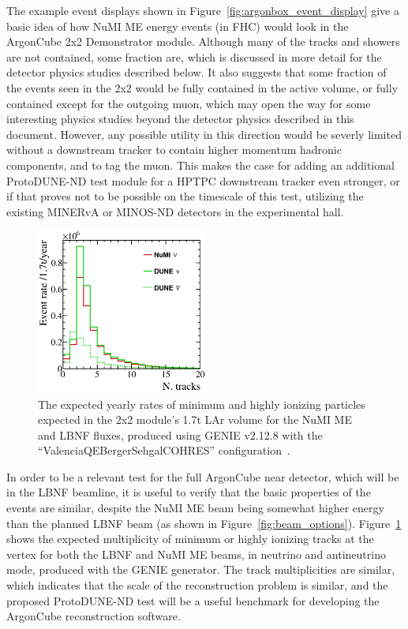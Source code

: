 The example event displays shown in Figure~\ref{fig:argonbox_event_display} give a basic idea of how NuMI ME energy events (in FHC) would look in the ArgonCube 2x2 Demonstrator module. Although many of the tracks and showers are not contained, some fraction are, which is discussed in more detail for the detector physics studies described below. It also suggests that some fraction of the events seen in the 2x2 would be fully contained in the active volume, or fully contained except for the outgoing muon, which may open the way for some interesting physics studies beyond the detector physics described in this document. However, any possible utility in this direction would be severly limited without a downstream tracker to contain higher momentum hadronic components, and to tag the muon. This makes the case for adding an additional ProtoDUNE-ND test module for a HPTPC downstream tracker even stronger, or if that proves not to be possible on the timescale of this test, utilizing the existing MINERvA or MINOS-ND detectors in the experimental hall.

\begin{figure}[htb]
  \centering
  \includegraphics[width=0.5\textwidth]{plots/2x2_ntracks_all.png}
  \caption{The expected yearly rates of minimum and highly ionizing particles expected in the 2x2 module's 1.7t LAr volume for the NuMI ME and LBNF fluxes, produced using GENIE v2.12.8 with the ``ValenciaQEBergerSehgalCOHRES'' configuration~\cite{genie}.}
  \label{fig:track_multiplicity}
\end{figure}
In order to be a relevant test for the full ArgonCube near detector, which will be in the LBNF beamline, it is useful to verify that the basic properties of the events are similar, despite the NuMI ME beam being somewhat higher energy than the planned LBNF beam (as shown in Figure~\ref{fig:beam_options}). Figure~\ref{fig:track_multiplicity} shows the expected multiplicity of minimum or highly ionizing tracks at the vertex for both the LBNF and NuMI ME beams, in neutrino and antineutrino mode, produced with the GENIE generator. The track multiplicities are similar, which indicates that the scale of the reconstruction problem is similar, and the proposed ProtoDUNE-ND test will be a useful benchmark for developing the ArgonCube reconstruction software.

